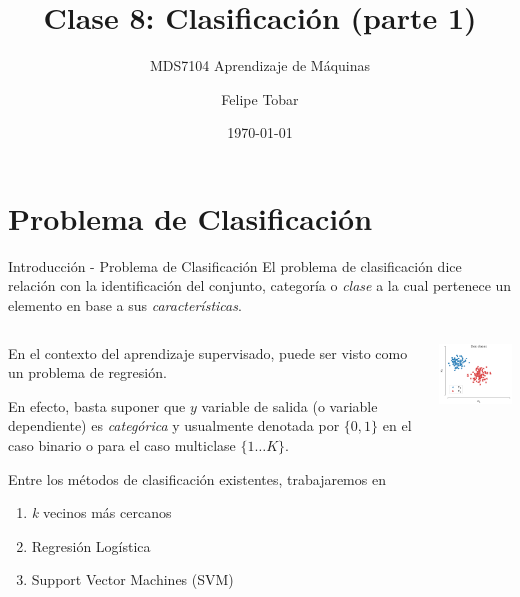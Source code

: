 \documentclass[9pt, handout]{beamer}
\title{Clase 8: Clasificación (parte 1)}
\subtitle{MDS7104 Aprendizaje de Máquinas}
\date{\today}
\author{Felipe Tobar}
\institute{Iniciativa de Datos e Inteligencia Artificial\\Universidad de Chile}
\begin{document}
\begin{frame}
  \titlepage
\end{frame}

\section{Problema de Clasificación}
\begin{frame}{Introducción - Problema de Clasificación}
El problema de clasificación dice relación con la identificación del conjunto, categoría o \emph{clase} a la cual pertenece un elemento en base a sus \emph{características}. \vspace{0.5cm} \pause

\begin{columns}

  \begin{column}{0.5\textwidth}
    En el contexto del aprendizaje supervisado, puede ser visto como un problema de regresión. \vspace{0.5cm} \pause

    En efecto, basta suponer que $y$ variable de salida (o variable dependiente) es \emph{categórica} y usualmente denotada por $\{ 0 , 1 \}$ en el caso binario o para el caso multiclase $\{ 1 \dots K \}$. \vspace{0.5cm} \pause

    Entre los métodos de clasificación existentes, trabajaremos en 

    \begin{enumerate}
      \item \emph{k} vecinos más cercanos \pause
      \item Regresión Logística \pause
      \item Support Vector Machines (SVM) \pause

    \end{enumerate}


  \end{column}

  \begin{column}{0.5\textwidth}
    \centering
    \includegraphics[width=5cm]{../../img/cap3_dosclases.pdf}\\
    \label{fig:puntos_2d}
  \end{column}


\end{columns}


\end{frame}
\end{document}
